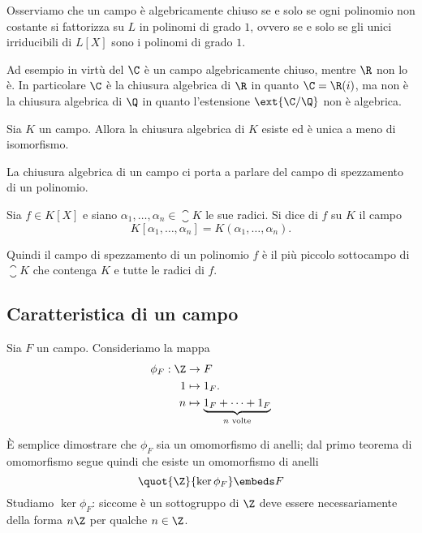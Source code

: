 Osserviamo che un campo è algebricamente chiuso se e solo se ogni polinomio non costante si fattorizza su $L$ in polinomi di grado $1$, ovvero se e solo se gli unici irriducibili di $L[X]$ sono i polinomi di grado $1$.

Ad esempio in virtù del  $\C$ è un campo algebricamente chiuso, mentre $\R$ non lo è. In particolare $\C$ è la chiusura algebrica di $\R$ in quanto $\C = \R(i)$, ma non è la chiusura algebrica di $\Q$ in quanto l'estensione $\ext{\C / \Q}$ non è algebrica.

\begin{theorem}
    Sia $K$ un campo. Allora la chiusura algebrica di $K$ esiste ed è unica a meno di isomorfismo.
\end{theorem}

La chiusura algebrica di un campo ci porta a parlare del campo di spezzamento di un polinomio.

\begin{definition}
    Sia $f \in K[X]$ e siano $\alpha_1, \dots, \alpha_n \in \closure{K}$ le sue radici. Si dice  di $f$ su $K$ il campo \[
        K[\alpha_1, \dots, \alpha_n] = K(\alpha_1, \dots, \alpha_n).    
    \]
\end{definition}

Quindi il campo di spezzamento di un polinomio $f$ è il più piccolo sottocampo di $\closure K$ che contenga $K$ e tutte le radici di $f$.

\subsection{Caratteristica di un campo}

Sia $F$ un campo. Consideriamo la mappa \begin{align*}
    \phi_F : \Z &\to F\\
    1 &\mapsto 1_F.\\
    n &\mapsto \underbrace{1_F + \dots + 1_F}_{n \text{ volte}}
\end{align*}

È semplice dimostrare che $\phi_F$ sia un omomorfismo di anelli; dal primo teorema di omomorfismo segue quindi che esiste un omomorfismo di anelli \[
    \quot{\Z}{\ker \phi_F} \embeds F
\] Studiamo $\ker \phi_F$: siccome è un sottogruppo di $\Z$ deve essere necessariamente della forma $n\Z$ per qualche $n \in \Z$.

